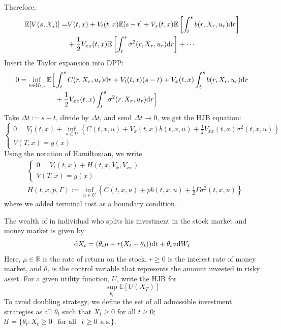 \documentclass[11pt]{book}
\newcommand{\dd}{\text{\normalfont d}}
\newcommand{\dt}{\text{\normalfont d}t}
\newcommand{\dr}{\text{\normalfont d}r}
\newcommand{\dW}{\text{\normalfont d}W}
\begin{document}
Therefore,
\[
\begin{split}
    \mathbb{E}[V(s,X_s)]  = & V(t,x) + V_t(t,x)\mathbb{E}[s-t]+V_x(t,x)\mathbb{E}\left[\int_t^s  b(r,X_r,u_r)\dr\right] \\
     &+ \frac12 V_{xx}(t,x)\mathbb{E}\left[\int_t^s  \sigma^2(r,X_r,u_r)\dr\right] + \cdots
\end{split}
\]
Insert the Taylor expansion into DPP:
\[
\begin{split}
    0= \inf_{u\in\mathcal{U}_{t,s}}\mathbb{E}\Big[&\int_t^s  C(r,X_r,u_r){\dr} + V_t(t,x)(s-t) +V_x(t,x)\int_t^s  b(r,X_r,u_r)\dr\\
    &+\frac12 V_{xx}(t,x)\int_t^s  \sigma^2(r,X_r,u_r)\dr\Big]
\end{split}
\]
Take $\Delta t:=s-t$, divide by $\Delta t$, and send $\Delta t\to 0$, we get the HJB equation:
\[
    \begin{cases}
    0= V_t(t,x) + \inf_{u\in U}\left\{ C(t,x,u)  + V_x(t,x) b(t,x,u)+\frac12 V_{xx}(t,x) \sigma^2(t,x,u)\right\}\\
    V(T,x)=g(x)
\end{cases}
\]
Using the notation of Hamiltonian, we write
\begin{align}
     &\begin{cases}
    0= V_t(t,x) + H(t,x,V_x,V_{xx})\\
    V(T,x)=g(x)
\end{cases}\label{eqn:HJB}\\
&\hspace{0cm}H(t,x,p,\Gamma):=\inf_{u\in U}\left\{ C(t,x,u)  + p b(t,x,u)+\frac12 \Gamma \sigma^2(t,x,u)\right\}\label{eqn:Hamilton_1d}
\end{align}
where we added terminal cost as a boundary condition.
\begin{ex}\label{ex:merton}
    The wealth of in individual who splits his investment in the stock market and money market is given by
    \[
    \dd X_t = (\theta_t \mu + r(X_t-\theta_t))\dt + \theta_t \sigma \dW_t
    \]
    Here, $\mu\in\mathbb{R}$ is the rate of return on the stock, $r\ge0$ is the interest rate of money market,  and $\theta_t$ is the control variable that represents the amount invested in risky asset. 
    For a given utility function, $U$, write the HJB for 
    \[
    \sup_{\theta_t}\mathbb{E}[U(X_T)]
    \]
    To avoid doubling strategy, we define the set of all admissible investment strategies as all $\theta_t$ such that $X_t\ge0$ for all $t\ge0$; $\mathcal{U}=\{\theta_t:X_t\ge0~~\text{ for all }~~t\ge0~~\text{a.s.}\}$.
\end{ex}
\end{document}

